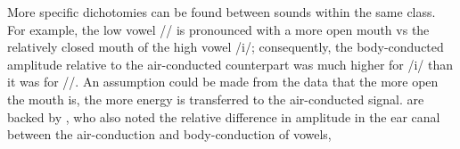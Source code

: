 
More specific dichotomies can be found between sounds within the same class. For example, the low vowel /\DIFdelbegin {}\DIFdelend \DIFaddbegin {}\DIFaddend / is pronounced with a more open mouth vs the relatively closed mouth of the high vowel /i/; consequently, the body-conducted amplitude relative to the air-conducted counterpart was much higher for /i/ than it was for /\DIFdelbegin {}\DIFdelend \DIFaddbegin {}\DIFaddend /. An assumption could be made from the data that the more open the mouth is, the more energy is transferred to the air-conducted signal.%
\DIFdelbegin {}\DIFdelend \DIFaddbegin {}\DIFaddend are backed by \cite{bekesy:60}, who also noted %
the relative difference in amplitude in the ear canal between the air-conduction and body-conduction of vowels, %
\DIFdelbegin {}\DIFdelend \DIFaddbegin {}

